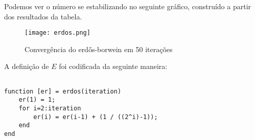 Podemos ver o número se estabilizando no seguinte gráfico, construído a partir
dos resultados da tabela.

\begin{figure}[H]
    \centering
    \texttt{[image: erdos.png]}
    \caption{Convergência do erdős-borwein em 50 iterações}
	\label{erdos_graphic}
\end{figure}

A definição de $E$ foi codificada da seguinte maneira:

\begin{lstlisting}

function [er] = erdos(iteration)
	er(1) = 1;
	for i=2:iteration
		er(i) = er(i-1) + (1 / ((2^i)-1));
	end
end

\end{lstlisting}
